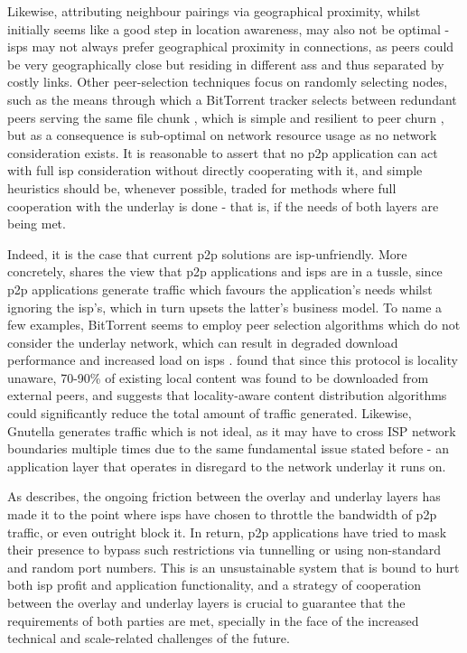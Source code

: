     Likewise, attributing neighbour pairings via geographical proximity, whilst initially seems like a good step in location awareness, may also not be optimal - \glspl{isp} may not always prefer geographical proximity in connections, as peers could be very geographically close but residing in different \glspl{as} and thus separated by costly links.
    Other peer-selection techniques focus on randomly selecting nodes, such as the means through which a BitTorrent tracker selects between redundant peers serving the same file chunk \cite{bittorrent-details}, which is simple and resilient to peer churn \cite{qin2009}, but as a consequence is sub-optimal on network resource usage as no network consideration exists.
    It is reasonable to assert that no \gls{p2p} application can act with full \gls{isp} consideration without directly cooperating with it, and simple heuristics should be, whenever possible, traded for methods where full cooperation with the underlay is done - that is, if the needs of both layers are being met.

    Indeed, it is the case that current \gls{p2p} solutions are \gls{isp}-unfriendly.
    More concretely, \cite{isp-p2p-tussle} shares the view that \gls{p2p} applications and \glspl{isp} are in a tussle, since \gls{p2p} applications generate traffic which favours the application's needs whilst ignoring the \gls{isp}'s, which in turn upsets the latter's business model.
    To name a few examples, BitTorrent seems to employ peer selection algorithms which do not consider the underlay network, which can result in degraded download performance and increased load on \glspl{isp} \cite{qin2009}.
    \cite{karagiannis} found that since this protocol is locality unaware, 70-90\% of existing local content was found to be downloaded from external peers, and suggests that locality-aware content distribution algorithms could significantly reduce the total amount of traffic generated.
    Likewise, Gnutella generates traffic which is not ideal, as it may have to cross ISP network boundaries multiple times \cite{estimating-gnutella} due to the same fundamental issue stated before - an application layer that operates in disregard to the network underlay it runs on.

    As \cite{dan-Commag10} describes, the ongoing friction between the overlay and underlay layers has made it to the point where \glspl{isp} have chosen to throttle the bandwidth of \gls{p2p} traffic, or even outright block it.
    In return, \gls{p2p} applications have tried to mask their presence to bypass such restrictions via tunnelling or using non-standard and random port numbers.
    This is an unsustainable system that is bound to hurt both \gls{isp} profit and application functionality, and a strategy of cooperation between the overlay and underlay layers is crucial to guarantee that the requirements of both parties are met, specially in the face of the increased technical and scale-related challenges of the future.


